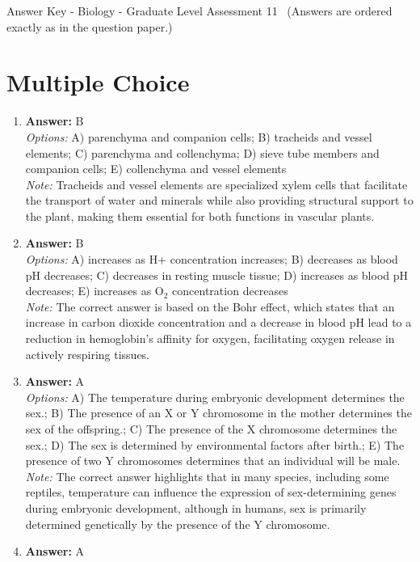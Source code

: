 \documentclass[12pt]{article}
\begin{document}
\begin{center}
Answer Key - Biology - Graduate Level Assessment 11 \
\small (Answers are ordered exactly as in the question paper.)
\end{center}

\section*{Multiple Choice}
\begin{enumerate}[label=\arabic*.]
\item \textbf{Answer:} B
\\ \textit{Options:} A) parenchyma and companion cells; B) tracheids and vessel elements; C) parenchyma and collenchyma; D) sieve tube members and companion cells; E) collenchyma and vessel elements
\\ \textit{Note:} Tracheids and vessel elements are specialized xylem cells that facilitate the transport of water and minerals while also providing structural support to the plant, making them essential for both functions in vascular plants.
\item \textbf{Answer:} B
\\ \textit{Options:} A) increases as H+ concentration increases; B) decreases as blood pH decreases; C) decreases in resting muscle tissue; D) increases as blood pH decreases; E) increases as O$_{2}$ concentration decreases
\\ \textit{Note:} The correct answer is based on the Bohr effect, which states that an increase in carbon dioxide concentration and a decrease in blood pH lead to a reduction in hemoglobin's affinity for oxygen, facilitating oxygen release in actively respiring tissues.
\item \textbf{Answer:} A
\\ \textit{Options:} A) The temperature during embryonic development determines the sex.; B) The presence of an X or Y chromosome in the mother determines the sex of the offspring.; C) The presence of the X chromosome determines the sex.; D) The sex is determined by environmental factors after birth.; E) The presence of two Y chromosomes determines that an individual will be male.
\\ \textit{Note:} The correct answer highlights that in many species, including some reptiles, temperature can influence the expression of sex-determining genes during embryonic development, although in humans, sex is primarily determined genetically by the presence of the Y chromosome.
\item \textbf{Answer:} A

\end{enumerate}
\end{document}
